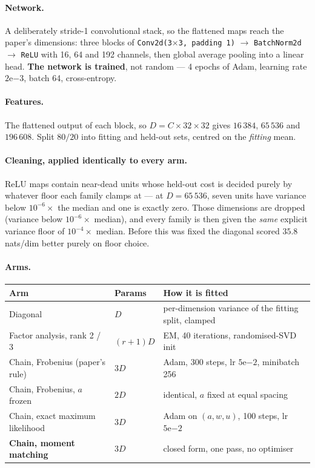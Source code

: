 \documentclass[11pt,a4paper]{article}
\newcommand{\code}[1]{\texttt{#1}}
\begin{document}
\paragraph{Network.} A deliberately stride-1 convolutional stack, so the flattened maps reach
the paper's dimensions: three blocks of
\code{Conv2d(3$\times$3, padding 1)} $\to$ \code{BatchNorm2d} $\to$ \code{ReLU} with 16, 64 and
192 channels, then global average pooling into a linear head. \textbf{The network is trained},
not random --- 4 epochs of Adam, learning rate $2\mathrm{e}{-3}$, batch 64, cross-entropy.

\paragraph{Features.} The flattened output of each block, so $D = C \times 32 \times 32$ gives
$16\,384$, $65\,536$ and $196\,608$. Split $80/20$ into fitting and held-out sets, centred on
the \emph{fitting} mean.

\paragraph{Cleaning, applied identically to every arm.} ReLU maps contain near-dead units whose
held-out cost is decided purely by whatever floor each family clamps at --- at $D = 65\,536$,
seven units have variance below $10^{-6}\times$ the median and one is exactly zero. Those
dimensions are dropped (variance below $10^{-6} \times$ median), and every family is then given
the \emph{same} explicit variance floor of $10^{-4} \times$ median. Before this was fixed the
diagonal scored $35.8$ nats/dim better purely on floor choice.

\paragraph{Arms.}

\begin{center}
\begin{tabular}{@{}lll@{}}
\toprule
Arm & Params & How it is fitted \\
\midrule
Diagonal & $D$ & per-dimension variance of the fitting split, clamped \\
Factor analysis, rank 2 / 3 & $(r{+}1)D$ & EM, 40 iterations, randomised-SVD init \\
Chain, Frobenius (paper's rule) & $3D$ & Adam, 300 steps, lr $5\mathrm{e}{-2}$, minibatch 256 \\
Chain, Frobenius, $a$ frozen & $2D$ & identical, $a$ fixed at equal spacing \\
Chain, exact maximum likelihood & $3D$ & Adam on $(a,w,u)$, 100 steps, lr $5\mathrm{e}{-2}$ \\
\textbf{Chain, moment matching} & $3D$ & closed form, one pass, no optimiser \\
\bottomrule
\end{tabular}
\end{center}
\end{document}

